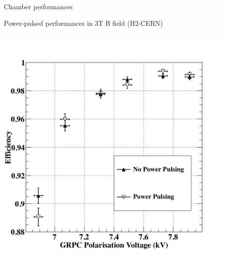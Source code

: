 \documentclass[10pt]{beamer}
\begin{document}
\begin{frame}{Chamber performances  }
\begin{block}{Power-pulsed performances in 3T B field (H2-CERN)}
\begin{columns}
      \begin{column}{0.5\textwidth}
        \centerline{\includegraphics[width=0.9\textwidth]{jpg/PowerPulsingHvScan}}
      \end{column}
    \end{columns}
  \end{block}

\end{frame}
\end{document}
